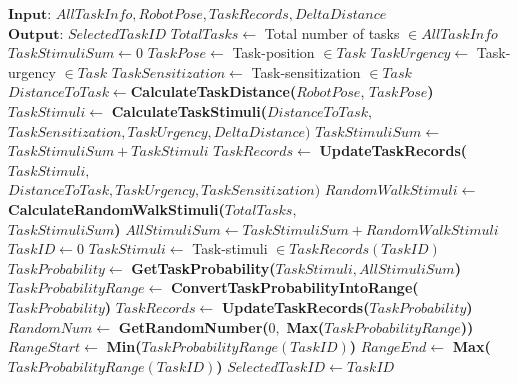 \documentclass[preprint,12pt]{elsarticle}
\begin{document}
\begin{algorithmic}[1]
\begin{small}
\label{alg:task-selector}
\State $\textbf{Input: } AllTaskInfo, RobotPose, TaskRecords, DeltaDistance$
\State $\textbf{Output: } SelectedTaskID$
\State {}
\State $TotalTasks \gets$  Total number of tasks $\in AllTaskInfo$  
\State $ TaskStimuliSum \gets 0 $
\State $ TaskPose \gets  $ Task-position  $ \in Task$
\State $ TaskUrgency \gets $ Task-urgency $ \in Task$
\State $ TaskSensitization \gets $ Task-sensitization $\in Task$
\State $ DistanceToTask \gets  $\textbf{CalculateTaskDistance(}$RobotPose$, $TaskPose$\textbf{)}
\State $ TaskStimuli \gets  $ \textbf{CalculateTaskStimuli(}$DistanceToTask,$\\ \hspace*{3.5cm} $TaskSensitization, 	        TaskUrgency, DeltaDistance\textbf{)}$
\State $ TaskStimuliSum \gets$  $TaskStimuliSum + TaskStimuli$
\State $ TaskRecords \gets $ \textbf{UpdateTaskRecords(}$TaskStimuli,$\\ \hspace*{3.5cm}$DistanceToTask, TaskUrgency, TaskSensitization\textbf{)}$
\EndFor
\State $RandomWalkStimuli \gets $ \textbf{CalculateRandomWalkStimuli(}$TotalTasks,$\\ \hspace*{4.5cm} $TaskStimuliSum$\textbf{)}
\State $ AllStimuliSum \gets TaskStimuliSum + RandomWalkStimuli $
\State {}
\State $ TaskID \gets 0 $ 
\State $ TaskStimuli \gets $ Task-stimuli $\in TaskRecords(TaskID)$
\State $ TaskProbability \gets  $ \textbf{GetTaskProbability(}$TaskStimuli, AllStimuliSum$\textbf{)}
\State $ TaskProbabilityRange \gets $ \textbf{ConvertTaskProbabilityIntoRange(}\\ \hspace*{6cm}$TaskProbability$\textbf{)}
\State $ TaskRecords \gets  $ \textbf{UpdateTaskRecords(}$TaskProbability$\textbf{)}
\EndWhile
\State {}
\State $ RandomNum \gets  $ \textbf{GetRandomNumber(}$0,$ \textbf{Max(}$TaskProbabilityRange$\textbf{))}
\State $ RangeStart \gets  $ \textbf{Min(}$TaskProbabilityRange (TaskID)$\textbf{)}
\State $ RangeEnd \gets  $ \textbf{Max(}$TaskProbabilityRange (TaskID)$\textbf{)}
\State $ SelectedTaskID \gets TaskID $ 
\EndIf
\EndWhile
\end{small}
\end{algorithmic}
\end{document}
